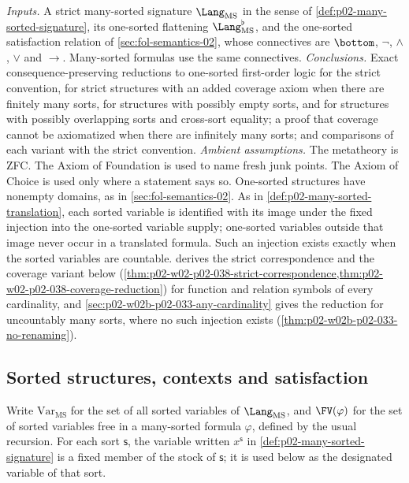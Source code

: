 \emph{Inputs.}  A strict many-sorted signature \(\Lang_{\mathrm{MS}}\) in the
sense of \cref{def:p02-many-sorted-signature}, its one-sorted flattening
\(\Lang_{\mathrm{MS}}^{\flat}\), and the one-sorted satisfaction relation of
\cref{sec:fol-semantics-02}, whose connectives are \(\bottom\), \(\neg\),
\(\land\), \(\lor\) and \(\to\).  Many-sorted formulas use the same
connectives.  \emph{Conclusions.}  Exact consequence-preserving reductions to
one-sorted first-order logic for the strict convention, for strict structures
with an added coverage axiom when there are finitely many sorts, for
structures with possibly empty sorts, and for structures with possibly
overlapping sorts and cross-sort equality; a proof that coverage cannot be
axiomatized when there are infinitely many sorts; and comparisons of each
variant with the strict convention.  \emph{Ambient assumptions.}  The
metatheory is ZFC.  The Axiom of Foundation is used to name fresh junk
points.  The Axiom of Choice is used only where a statement says so.
One-sorted structures have nonempty domains, as in
\cref{sec:fol-semantics-02}.  As in \cref{def:p02-many-sorted-translation},
each sorted variable is identified with its image under the fixed injection
into the one-sorted variable supply; one-sorted variables outside that image
never occur in a translated formula.  Such an injection exists exactly when
the sorted variables are countable.
 derives the strict correspondence
and the coverage variant below
(\cref{thm:p02-w02-p02-038-strict-correspondence,thm:p02-w02-p02-038-coverage-reduction})
for function and relation symbols of every cardinality, and
\cref{sec:p02-w02b-p02-033-any-cardinality} gives the reduction for
uncountably many sorts, where no such injection exists
(\cref{thm:p02-w02b-p02-033-no-renaming}).

\subsection{Sorted structures, contexts and satisfaction}
\label{sec:p02-w02-p02-038-clauses}

Write \(\mathrm{Var}_{\mathrm{MS}}\) for the set of all sorted variables of
\(\Lang_{\mathrm{MS}}\), and \(\FV(\varphi)\) for the set of sorted variables
free in a many-sorted formula \(\varphi\), defined by the usual recursion.
For each sort \(\mathsf s\), the variable written \(x^{\mathsf s}\) in
\cref{def:p02-many-sorted-signature} is a fixed member of the stock of
\(\mathsf s\); it is used below as the designated variable of that sort.

